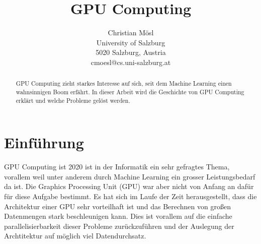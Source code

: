 \documentclass[10pt,twocolumn]{article}          %
\begin{document}
\title{GPU Computing}

\author{Christian M\"osl\\
University of Salzburg \\ 5020 Salzburg, Austria \\ cmoesl@cs.uni-salzburg.at\\
}

\maketitle
\thispagestyle{empty}

\begin{abstract}
GPU Computing zieht starkes Interesse auf sich, seit dem Machine Learning einen wahnsinnigen Boom erf\"ahrt. 
In dieser Arbeit wird die Geschichte von GPU Computing erkl\"art und welche Probleme gel\"ost werden.
\end{abstract}

\section{Einf\"uhrung}
GPU Computing ist 2020 ist in der Informatik ein sehr gefragtes Thema, vorallem weil unter anderem durch Machine Learning ein grosser Leistungsbedarf da ist.
Die Graphics Processing Unit (GPU) war aber nicht von Anfang an daf\"ur f\"ur diese Aufgabe bestimmt. 
Es hat sich im Laufe der Zeit herausgestellt, dass die Architektur einer GPU sehr vorteilhaft ist und das Berechnen von großen Datenmengen stark beschleunigen kann.
Dies ist vorallem auf die einfache parallelisierbarkeit dieser Probleme zur\"uckzuf\"uhren und der Auslegung der Archtitektur auf m\"oglich viel Datendurchsatz. 


\end{document}

